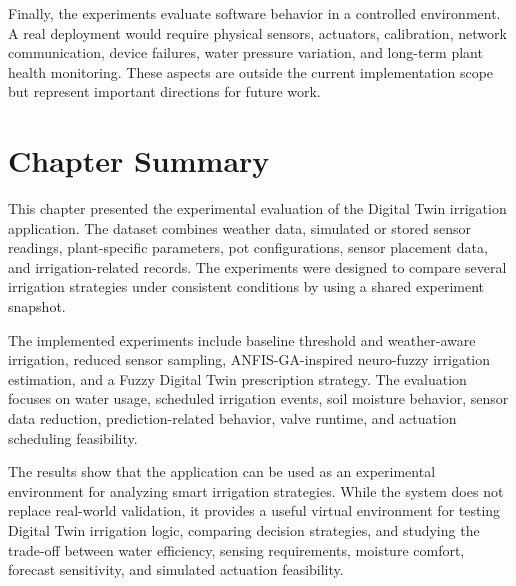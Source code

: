 \par Finally, the experiments evaluate software behavior in a controlled environment. A
    real deployment would require physical sensors, actuators, calibration, network
    communication, device failures, water pressure variation, and long-term plant health
    monitoring. These aspects are outside the current implementation scope but represent
    important directions for future work.

\section{Chapter Summary}
\label{sec:ch4summary}

\par This chapter presented the experimental evaluation of the Digital Twin irrigation
    application. The dataset combines weather data, simulated or stored sensor readings,
    plant-specific parameters, pot configurations, sensor placement data, and
    irrigation-related records. The experiments were designed to compare several
    irrigation strategies under consistent conditions by using a shared experiment
    snapshot.

\par The implemented experiments include baseline threshold and weather-aware irrigation,
    reduced sensor sampling, ANFIS-GA-inspired neuro-fuzzy irrigation estimation, and a
    Fuzzy Digital Twin prescription strategy. The evaluation focuses on water usage,
    scheduled irrigation events, soil moisture behavior, sensor data reduction,
    prediction-related behavior, valve runtime, and actuation scheduling feasibility.

\par The results show that the application can be used as an experimental environment for
    analyzing smart irrigation strategies. While the system does not replace real-world
    validation, it provides a useful virtual environment for testing Digital Twin
    irrigation logic, comparing decision strategies, and studying the trade-off between
    water efficiency, sensing requirements, moisture comfort, forecast sensitivity, and
    simulated actuation feasibility.
